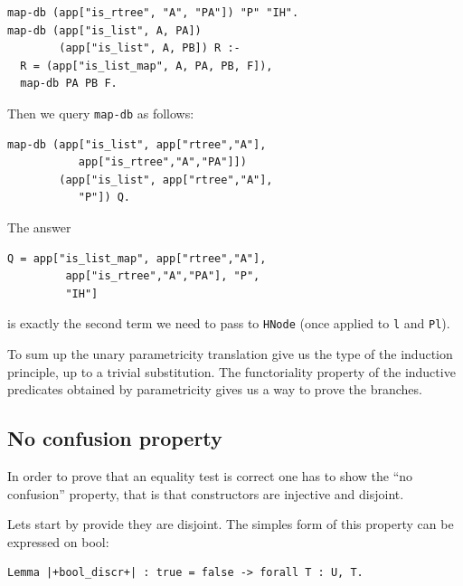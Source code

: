 \documentclass[sigplan,10pt,review]{acmart}\settopmatter{printfolios=true,printccs=false,printacmref=false}
\begin{document}
\begin{minipage}{\textwidth}\begin{lstlisting}[]
map-db (app["is_rtree", "A", "PA"]) "P" "IH".
map-db (app["is_list", A, PA])
        (app["is_list", A, PB]) R :-
  R = (app["is_list_map", A, PA, PB, F]),
  map-db PA PB F.
\end{lstlisting}\end{minipage}

Then we query \lstinline+map-db+ as follows:

\begin{minipage}{\textwidth}\begin{lstlisting}[]
map-db (app["is_list", app["rtree","A"],
           app["is_rtree","A","PA"]])
        (app["is_list", app["rtree","A"],
           "P"]) Q.
\end{lstlisting}\end{minipage}

\noindent
The answer

\begin{minipage}{\textwidth}\begin{lstlisting}[]
Q = app["is_list_map", app["rtree","A"],
         app["is_rtree","A","PA"], "P",
         "IH"]
\end{lstlisting}\end{minipage}

\noindent
is exactly the second term we need to pass to \lstinline+HNode+
(once applied to \lstinline+l+ and \lstinline+Pl+).

To sum up the unary parametricity translation give us the type
of the induction principle, up to a trivial substitution.
The functoriality property of the inductive predicates obtained by
parametricity gives us a way to prove the branches.

\subsection{No confusion property} %

In order to prove that an equality test is correct
one has to show the ``no confusion'' property, that is that
constructors are injective and disjoint.

Lets start by provide they are disjoint.
The simples form of this property can be expressed on bool:

\begin{minipage}{\textwidth}\begin{lstlisting}
Lemma |+bool_discr+| : true = false -> forall T : U, T.
\end{lstlisting}\end{minipage}
\end{document}
